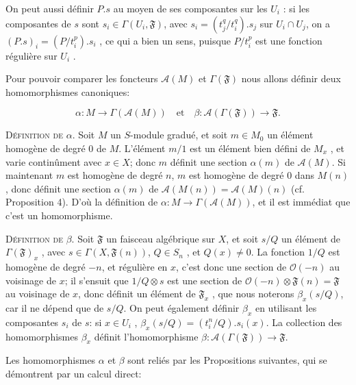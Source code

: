 On peut aussi définir $P.s$ au moyen de ses composantes sur les $U_{i}$ : si les composantes de $s$ sont $s_{i} \in \Gamma(U_{i} , \mathfrak{F})$, avec $s_{i} = (t_{j}^{q}/t_{i}^{q}).s_{j}$ sur $U_{i} \cap U_{j}$, on a $(P.s)_{i} = (P/t_{i}^{p}).s_{i}$ , ce qui a bien un sens, puisque $P/t_{i}^{p}$ est une fonction régulière sur $U_{i}$ .

Pour pouvoir comparer les foncteurs $\mathcal{A}(M)$ et $\Gamma(\mathfrak{F})$ nous allons définir deux homomorphismes canoniques:

\begin{equation*}
\alpha : M \to \Gamma(\mathcal{A}(M)) \quad \mathrm{et} \quad \beta : \mathcal{A}(\Gamma(\mathfrak{F})) \to \mathfrak{F}.
\end{equation*}


\textsc{Définition de} $\alpha$. Soit $M$ un $S$-module gradué, et soit $m \in M_{0}$ un élément homogène de degré 0 de $M$. L'élément $m/1$ est un élément bien défini de $M_{x}$ , et varie continûment avec $x \in X$; donc $m$ définit une section $\alpha(m)$ de $\mathcal{A}(M)$. Si maintenant $m$ est homogène de degré $n$, $m$ est homogène de degré 0 dans $M(n)$, donc définit une section $\alpha(m)$ de $\mathcal{A}(M(n)) = \mathcal{A}(M)(n)$ (cf. Proposition 4). D'où la définition de $\alpha : M \to \Gamma(\mathcal{A}(M))$, et il est immédiat que c'est un homomorphisme.

\textsc{Définition de} $\beta$. Soit $\mathfrak{F}$ un faisceau algébrique sur $X$, et soit $s/Q$ un élément de $\Gamma(\mathfrak{F})_{x}$ , avec $s \in \Gamma(X, \mathfrak{F}(n))$, $Q \in S_{n}$ , et $Q(x) \neq 0$. La fonction $1/Q$ est homogène de degré $-n$, et régulière en $x$, c'est donc une section de $\mathcal{O}(-n)$ au voisinage de $x$; il s'ensuit que $1/Q \otimes s$ est une section de $\mathcal{O}(-n) \otimes \mathfrak{F}(n) = \mathfrak{F}$ au voisinage de $x$, donc définit un élément de $\mathfrak{F}_{x}$ , que nous noterons $\beta_{x}(s/Q)$, car il ne dépend que de $s/Q$. On peut également définir $\beta_{x}$ en utilisant les composantes $s_{i}$ de $s$: si $x \in U_{i}$ , $\beta_{x}(s/Q) = (t_{i}^{n}/Q).s_{i}(x)$. La collection des homomorphismes $\beta_{x}$ définit l'homomorphisme $\beta : \mathcal{A}(\Gamma(\mathfrak{F})) \to \mathfrak{F}$.

Les homomorphismes $\alpha$ et $\beta$ sont reliés par les Propositions suivantes, qui se démontrent par un calcul direct:

